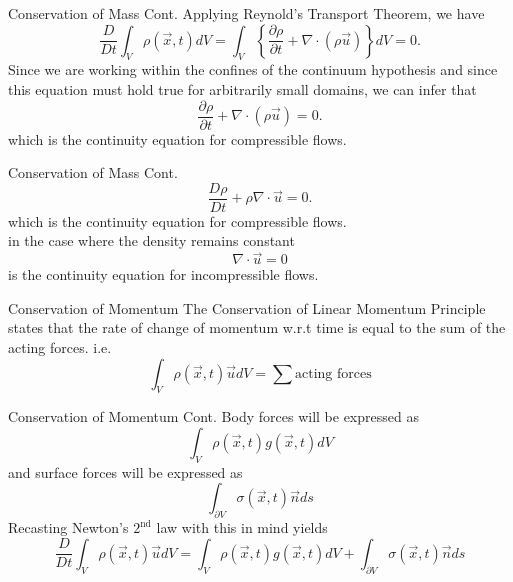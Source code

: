 \documentclass[frames]{prosper}
\begin{document}
\begin{slide}[Dissolve]{Conservation of Mass Cont.}
Applying Reynold's Transport Theorem, we have \begin{equation} \frac{D}{Dt} \int_{V} \rho(\stackrel{\rightarrow}{x},t)dV = \int_{V} \left\{\frac{\partial \rho}{\partial t} + \nabla \cdot(\rho \stackrel{\rightarrow}{u})\right\}dV = 0. \end{equation} Since we are working within the confines of the continuum hypothesis and since this equation must hold true for arbitrarily small domains, we can infer that \begin{equation} \frac{\partial \rho}{\partial t} + \nabla \cdot(\rho \stackrel{\rightarrow}{u}) = 0.\end{equation} which is the continuity equation for compressible flows.
\end{slide}

\begin{slide}[Dissolve]{Conservation of Mass Cont.}
$$\frac{D\rho}{Dt} + \rho \nabla \cdot \stackrel{\rightarrow}{u} = 0.$$
which is the continuity equation for compressible flows.\\
in the case where the density remains constant $$\nabla \cdot \stackrel{\rightarrow}{u} = 0$$
is the continuity equation for incompressible flows.
\end{slide}











\begin{slide}[Dissolve]{Conservation of Momentum}
The Conservation of Linear Momentum Principle states that the rate of change of momentum w.r.t time is equal to the sum of the acting forces.
i.e.
$$\int_{V} \rho(\stackrel{\rightarrow}{x},t) \stackrel{\rightarrow}{u}dV = \sum \mbox{acting forces}$$
\end{slide}

\begin{slide}[Dissolve]{Conservation of Momentum Cont.}
Body forces will be expressed as $$ \int_{V} \rho(\stackrel{\rightarrow}{x},t) g(\stackrel{\rightarrow}{x},t)dV $$ and surface forces will be expressed as $$ \int_{\partial V} \sigma(\stackrel{\rightarrow}{x},t)\stackrel{\rightarrow}{n}ds $$
Recasting Newton's $2^{\mbox{nd}}$ law with this in mind yields $$ \frac{D}{Dt} \int_{V} \rho(\stackrel{\rightarrow}{x},t) \stackrel{\rightarrow}{u}dV = \int_{V} \rho(\stackrel{\rightarrow}{x},t) g(\stackrel{\rightarrow}{x},t)dV + \int_{\partial V} \sigma(\stackrel{\rightarrow}{x},t)\stackrel{\rightarrow}{n}ds $$
\end{slide}
\end{document}
